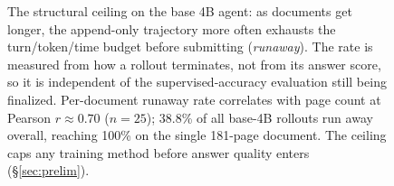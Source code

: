 \begin{figure}[t]
\centering
{}
\caption{The structural ceiling on the base 4B agent: as documents get longer, the append-only trajectory more often exhausts the turn/token/time budget before submitting (\emph{runaway}). The rate is measured from how a rollout terminates, not from its answer score, so it is independent of the supervised-accuracy evaluation still being finalized. Per-document runaway rate correlates with page count at Pearson $r \approx 0.70$ ($n{=}25$); 38.8\% of all base-4B rollouts run away overall, reaching 100\% on the single 181-page document. The ceiling caps any training method before answer quality enters (\S\ref{sec:prelim}).}
\label{fig:runaway}
\end{figure}